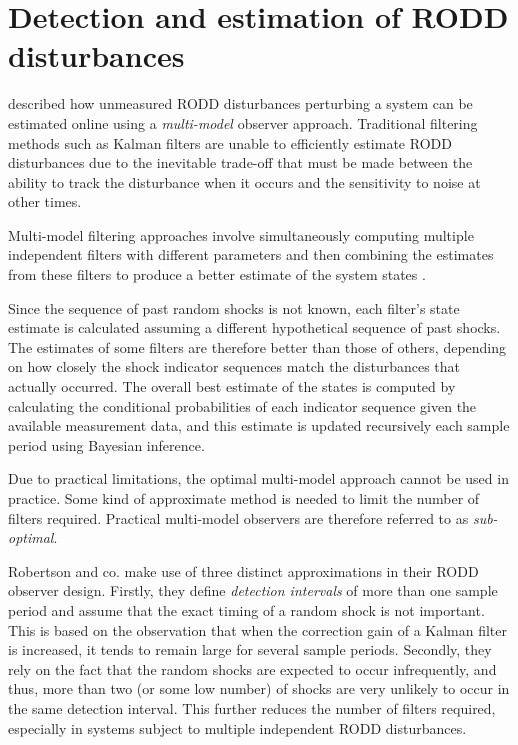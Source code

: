 \section*{Detection and estimation of RODD disturbances}\label{detection_RODDs}

\cite{robertson_detection_1995} described how unmeasured RODD disturbances perturbing a system can be estimated online using a \textit{multi-model} observer approach. Traditional filtering methods such as Kalman filters are unable to efficiently estimate RODD disturbances due to the inevitable trade-off that must be made between the ability to track the disturbance when it occurs and the sensitivity to noise at other times.

Multi-model filtering approaches involve simultaneously computing multiple independent filters with different parameters and then combining the estimates from these filters to produce a better estimate of the system states \citep{jaffer_estimation_1971, buxbaum_recursive_1970, tugnait_detection_1982}.

Since the sequence of past random shocks is not known, each filter's state estimate is calculated assuming a different hypothetical sequence of past shocks. The estimates of some filters are therefore better than those of others, depending on how closely the shock indicator sequences match the disturbances that actually occurred. The overall best estimate of the states is computed by calculating the conditional probabilities of each indicator sequence given the available measurement data, and this estimate is updated recursively each sample period using Bayesian inference.

Due to practical limitations, the optimal multi-model approach cannot be used in practice. Some kind of approximate method is needed to limit the number of filters required. Practical multi-model observers are therefore referred to as \textit{sub-optimal}.

Robertson and co. make use of three distinct approximations in their RODD observer design. Firstly, they define \textit{detection intervals} of more than one sample period and assume that the exact timing of a random shock is not important. This is based on the observation that when the correction gain of a Kalman filter is increased, it tends to remain large for several sample periods. Secondly, they rely on the fact that the random shocks are expected to occur infrequently, and thus, more than two (or some low number) of shocks are very unlikely to occur in the same detection interval. This further reduces the number of filters required, especially in systems subject to multiple independent RODD disturbances.

